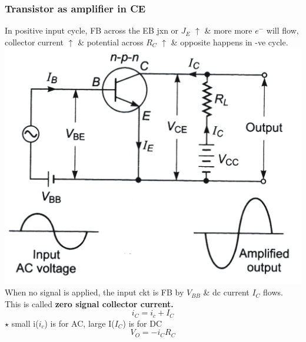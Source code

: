 \documentclass[10pt, a4paper]{report}
\begin{document}
	\subsubsection{Transistor as amplifier in CE}
	In positive input cycle, FB across the EB jxn or $ J_E $ $\uparrow$ \& more more $ e^- $ will flow, collector current $\uparrow$ \& potential across $ R_C $ $\uparrow$ \& opposite happens in -ve cycle.
	\includegraphics[width=\linewidth]{img/ce amplifier}\\
	When no signal is applied, the input ckt is FB by $ V_{BB} $ \& dc current $ I_C $ flows. This is called \textbf{zero signal collector current.}
	$$ i_C = i_c + I_C $$
	$\star$ small i($ i_c $) is for AC, large I($ I_C $) is for DC\\
	$$ V_O = -i_C R_C $$
	
\end{document}
